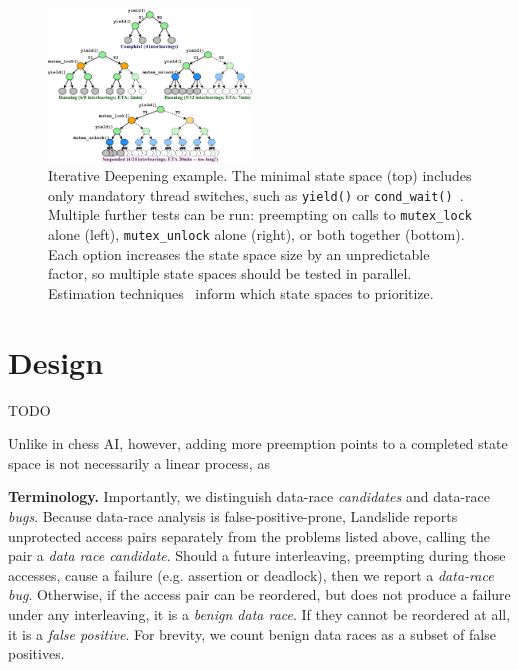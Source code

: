 \begin{figure}[t]
	\includegraphics[width=0.48\textwidth]{trees.pdf}
	\caption{Iterative Deepening example.
		The minimal state space (top) includes only mandatory thread switches, such as {\tt yield()} or {\tt cond\_wait()}~\cite{landslide}.
		Multiple further tests can be run: preempting on calls to {\tt mutex\_lock} alone (left), {\tt mutex\_unlock} alone (right), or both together (bottom).
Each option increases the state space size by an unpredictable factor, so multiple state spaces should be tested in parallel.
Estimation techniques~\cite{estimation} inform which state spaces to prioritize.
}
	\label{fig:id}
\end{figure}
\section{Design}

TODO

Unlike in chess AI, however, adding more preemption points to a completed state space is not necessarily a linear process, as  %


{\bf Terminology.}
Importantly, we distinguish data-race {\em candidates} and data-race {\em bugs}.
Because data-race analysis is false-positive-prone, Landslide reports unprotected access pairs separately from the problems listed above, calling the pair a {\em data race candidate}.
Should a future interleaving, preempting during those accesses, cause a failure (e.g. assertion or deadlock), then we report a {\em data-race bug}.
Otherwise, if the access pair can be reordered, but does not produce a failure under any interleaving, it is a {\em benign data race}.
If they cannot be reordered at all, it is a {\em false positive}.
For brevity, we count benign data races as a subset of false positives.

